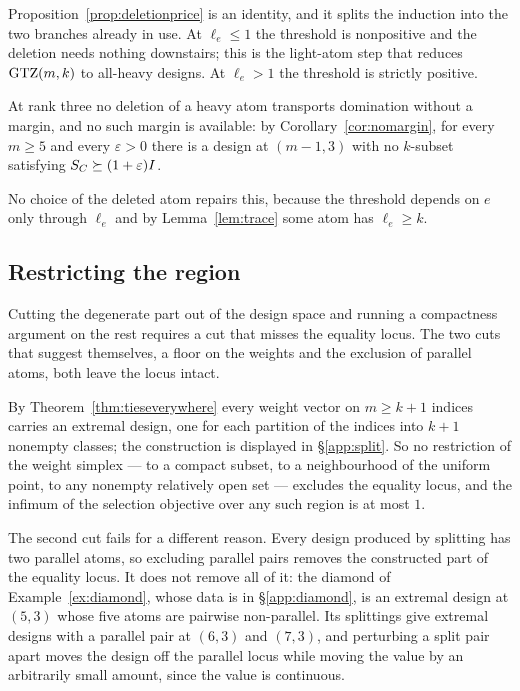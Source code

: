 Proposition~\ref{prop:deletionprice} is an identity, and it splits the
induction into the two branches already in use.  At $\ell_e\le1$
the threshold is nonpositive and the deletion needs nothing downstairs;
this is the light-atom step that reduces $\mathrm{GTZ}(m,k)$ to all-heavy
designs.  At $\ell_e>1$ the threshold is strictly positive.

\begin{corollary}\label{cor:noheavydeletion}
At rank three no deletion of a heavy atom transports domination without a
margin, and no such margin is available: by Corollary~\ref{cor:nomargin}, for
every $m\ge5$ and every $\varepsilon>0$ there is a design at $(m-1,3)$ with no
$k$-subset satisfying $S_{C}\succeq(1+\varepsilon)I$.
\end{corollary}

No choice of the deleted atom repairs this, because the threshold depends on
$e$ only through $\ell_e$ and by Lemma~\ref{lem:trace} some atom has
$\ell_e\ge k$.

\subsection{Restricting the region}\label{app:region}

Cutting the degenerate part out of the design space and running a
compactness argument on the rest requires a cut that misses the equality
locus.  The two cuts that suggest themselves, a floor on the weights and
the exclusion of parallel atoms, both leave the locus intact.

By Theorem~\ref{thm:tieseverywhere} every weight vector on $m\ge k+1$ indices
carries an extremal design, one for each partition of the indices into $k+1$
nonempty classes; the construction is displayed in \S\ref{app:split}.  So no
restriction of the weight simplex --- to a compact subset, to a
neighbourhood of the uniform point, to any nonempty relatively open set ---
excludes the equality locus, and the infimum of the selection objective over
any such region is at most $1$.

The second cut fails for a different reason.  Every design produced by
splitting has two parallel atoms, so excluding parallel pairs removes the
constructed part of the equality locus.  It does not remove all of it: the
diamond of Example~\ref{ex:diamond}, whose data is in \S\ref{app:diamond}, is
an extremal design at $(5,3)$ whose five atoms are pairwise non-parallel.  Its
splittings give extremal designs with a parallel pair at $(6,3)$ and $(7,3)$,
and perturbing a split pair apart moves the design off the parallel locus while
moving the value by an arbitrarily small amount, since the value is continuous.


